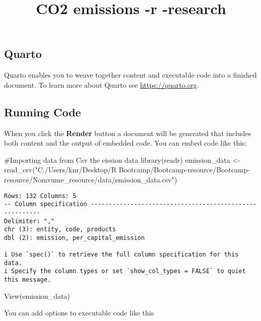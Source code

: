 \documentclass[
  letterpaper,
  DIV=11,
  numbers=noendperiod]{scrartcl}
\title{CO2 emissions -r -research}
\author{}
\date{}
\newenvironment{Shaded}{\begin{snugshade}}{\end{snugshade}}
\newcommand{\CommentTok}[1]{\textcolor[rgb]{0.37,0.37,0.37}{#1}}
\newcommand{\FunctionTok}[1]{\textcolor[rgb]{0.28,0.35,0.67}{#1}}
\newcommand{\NormalTok}[1]{\textcolor[rgb]{0.00,0.23,0.31}{#1}}
\newcommand{\OtherTok}[1]{\textcolor[rgb]{0.00,0.23,0.31}{#1}}
\newcommand{\StringTok}[1]{\textcolor[rgb]{0.13,0.47,0.30}{#1}}
\begin{document}
\maketitle

\subsection{Quarto}\label{quarto}

Quarto enables you to weave together content and executable code into a
finished document. To learn more about Quarto see
\url{https://quarto.org}.

\subsection{Running Code}\label{running-code}

When you click the \textbf{Render} button a document will be generated
that includes both content and the output of embedded code. You can
embed code like this:

\begin{Shaded}
\begin{Highlighting}[]
\CommentTok{\#Importing data from Csv the eission data}
\FunctionTok{library}\NormalTok{(readr)}
\NormalTok{emission\_data }\OtherTok{\textless{}{-}} \FunctionTok{read\_csv}\NormalTok{(}\StringTok{"C:/Users/knr/Desktop/R Bootcamp/Bootcamp{-}resource/Bootcamp{-}resource/Nomvume\_resource/data/emission\_data.csv"}\NormalTok{)}
\end{Highlighting}
\end{Shaded}

\begin{verbatim}
Rows: 132 Columns: 5
-- Column specification --------------------------------------------------------
Delimiter: ","
chr (3): entity, code, products
dbl (2): emission, per_capital_emission

i Use `spec()` to retrieve the full column specification for this data.
i Specify the column types or set `show_col_types = FALSE` to quiet this message.
\end{verbatim}

\begin{Shaded}
\begin{Highlighting}[]
\FunctionTok{View}\NormalTok{(emission\_data)}
\end{Highlighting}
\end{Shaded}

You can add options to executable code like this
\end{document}
